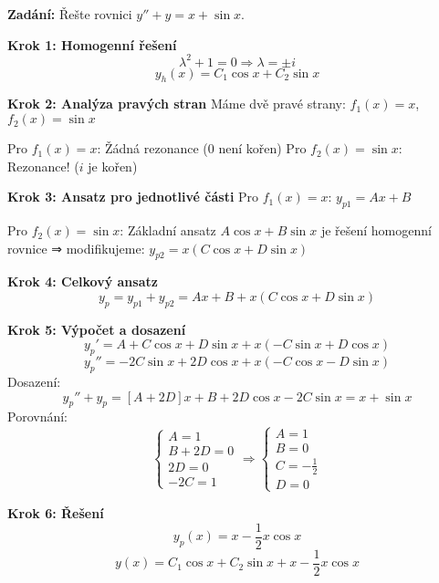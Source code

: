 \begin{example}
\label{ex:kombinace-vice-typu}

\noindent\textbf{Zadání:} Řešte rovnici $y'' + y = x + \sin x$.

\vspace{1.5\baselineskip}

\noindent\textbf{Krok 1: Homogenní řešení}
\[
\lambda^2 + 1 = 0 \Rightarrow \lambda = \pm i
\]
\[
y_h(x) = C_1 \cos x + C_2 \sin x
\]

\vspace{1\baselineskip}

\noindent\textbf{Krok 2: Analýza pravých stran}
Máme dvě pravé strany: $f_1(x) = x$, $f_2(x) = \sin x$

Pro $f_1(x) = x$: Žádná rezonance (0 není kořen)
Pro $f_2(x) = \sin x$: Rezonance! ($i$ je kořen)

\vspace{1\baselineskip}

\noindent\textbf{Krok 3: Ansatz pro jednotlivé části}
Pro $f_1(x) = x$: $y_{p1} = Ax + B$

Pro $f_2(x) = \sin x$: Základní ansatz $A\cos x + B\sin x$ je řešení homogenní rovnice ⇒ modifikujeme: $y_{p2} = x(C\cos x + D\sin x)$

\vspace{1\baselineskip}

\noindent\textbf{Krok 4: Celkový ansatz}
\[
y_p = y_{p1} + y_{p2} = Ax + B + x(C\cos x + D\sin x)
\]

\vspace{1\baselineskip}

\noindent\textbf{Krok 5: Výpočet a dosazení}
\[
y_p' = A + C\cos x + D\sin x + x(-C\sin x + D\cos x)
\]
\[
y_p'' = -2C\sin x + 2D\cos x + x(-C\cos x - D\sin x)
\]
Dosazení:
\[
y_p'' + y_p = [A + 2D]x + B + 2D\cos x - 2C\sin x = x + \sin x
\]
Porovnání:
\[
\begin{cases}
A = 1 \\
B + 2D = 0 \\
2D = 0 \\
-2C = 1
\end{cases}
\Rightarrow
\begin{cases}
A = 1 \\
B = 0 \\
C = -\frac{1}{2} \\
D = 0
\end{cases}
\]

\vspace{1\baselineskip}

\noindent\textbf{Krok 6: Řešení}
\[
y_p(x) = x - \frac{1}{2}x\cos x
\]
\[
y(x) = C_1 \cos x + C_2 \sin x + x - \frac{1}{2}x\cos x
\]

\end{example}

